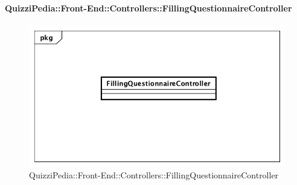 \paragraph{QuizziPedia::Front-End::Controllers::FillingQuestionnaireController}
\begin{figure}
	\centering
	\includegraphics[scale=0.45]{UML/Classi/Front-End/QuizziPedia_Front-end_Controller_FillingQuestionnaireController.png}
	\caption{QuizziPedia::Front-End::Controllers::FillingQuestionnaireController}
\end{figure}
